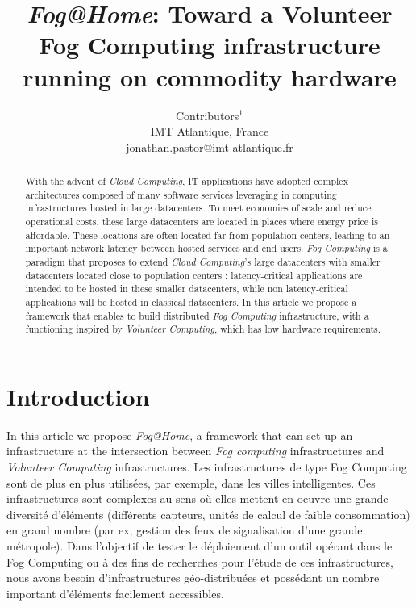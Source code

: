 \documentclass[letterpaper, 10 pt, conference]{ieeeconf}
\title{\LARGE \bf
\textit{Fog@Home}: Toward a Volunteer Fog Computing infrastructure \\running on commodity hardware
}
\author{Contributors$^{1}$%
\\IMT Atlantique, France
\\jonathan.pastor@imt-atlantique.fr
}
\begin{document}
\maketitle
\thispagestyle{empty}
\pagestyle{empty}


\begin{abstract}
With the advent of \textit{Cloud Computing}, IT applications have adopted complex architectures composed of many software services leveraging in computing infrastructures hosted in large datacenters. 
To meet economies of scale and reduce operational costs, these large datacenters are located in places where energy price is affordable.
These locations are often located far from population centers, leading to an important network latency between hosted services and end users.
\textit{Fog Computing} is a paradigm that proposes to extend \textit{Cloud Computing}'s large datacenters with smaller datacenters located close to population centers : latency-critical applications are intended to be hosted in these smaller datacenters, while non latency-critical applications will be hosted in classical datacenters.
In this article we propose a framework that enables to build distributed \textit{Fog Computing} infrastructure, with a functioning inspired by \textit{Volunteer Computing}, which has low hardware requirements.
\end{abstract}

\section{Introduction}
In this article we propose \textit{Fog@Home}, a framework that can set up an infrastructure at the intersection between \textit{Fog computing} infrastructures and \textit{Volunteer Computing} infrastructures.
Les infrastructures de type Fog Computing sont de plus en plus utilisées, par exemple, dans les villes intelligentes. Ces infrastructures sont complexes au sens où elles mettent en oeuvre une grande diversité d'éléments (différents capteurs, unités de calcul de faible consommation) en grand nombre (par ex, gestion des feux de signalisation d'une grande métropole). Dans l'objectif de tester le déploiement d'un outil opérant dans le Fog Computing ou à des fins de recherches pour l'étude de ces infrastructures, nous avons besoin d'infrastructures géo-distribuées et possédant un nombre important d'éléments facilement accessibles.
\end{document}

